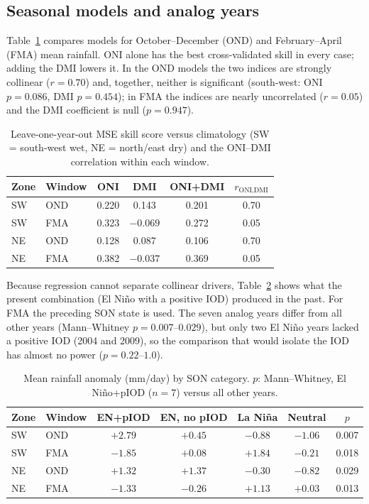 \documentclass{article}
\begin{document}
\subsection{Seasonal models and analog years}
Table~\ref{tab:skill} compares models for October--December (OND) and February--April (FMA) mean
rainfall. ONI alone has the best cross-validated skill in every case; adding the DMI lowers it.
In the OND models the two indices are strongly collinear ($r=0.70$) and, together, neither is
significant (south-west: ONI $p=0.086$, DMI $p=0.454$); in FMA the indices are nearly uncorrelated
($r=0.05$) and the DMI coefficient is null ($p=0.947$).

\begin{table}[t]
\centering
\footnotesize
\caption{Leave-one-year-out MSE skill score versus climatology (SW = south-west wet, NE = north/east
dry) and the ONI--DMI correlation within each window.}
\label{tab:skill}
\begin{tabular}{llcccc}
\toprule
Zone & Window & ONI & DMI & ONI+DMI & $r_{\text{ONI,DMI}}$ \\
\midrule
SW & OND & 0.220 & 0.143 & 0.201 & 0.70 \\
SW & FMA & 0.323 & $-0.069$ & 0.272 & 0.05 \\
NE & OND & 0.128 & 0.087 & 0.106 & 0.70 \\
NE & FMA & 0.382 & $-0.037$ & 0.369 & 0.05 \\
\bottomrule
\end{tabular}
\end{table}

Because regression cannot separate collinear drivers, Table~\ref{tab:analog} shows what the present
combination (El Ni\~{n}o with a positive IOD) produced in the past. For FMA the preceding SON state
is used. The seven analog years differ from all other years (Mann--Whitney $p=0.007$--$0.029$), but
only two El Ni\~{n}o years lacked a positive IOD (2004 and 2009), so the comparison that would isolate
the IOD has almost no power ($p=0.22$--$1.0$).

\begin{table}[t]
\centering
\footnotesize
\setlength{\tabcolsep}{2.5pt}
\caption{Mean rainfall anomaly (mm/day) by SON category. $p$: Mann--Whitney, El Ni\~{n}o+pIOD
($n=7$) versus all other years.}
\label{tab:analog}
\begin{tabular}{llccccc}
\toprule
Zone & Window & EN+pIOD & EN, no pIOD & La Ni\~{n}a & Neutral & $p$ \\
\midrule
SW & OND & $+2.79$ & $+0.45$ & $-0.88$ & $-1.06$ & 0.007 \\
SW & FMA & $-1.85$ & $+0.08$ & $+1.84$ & $-0.21$ & 0.018 \\
NE & OND & $+1.32$ & $+1.37$ & $-0.30$ & $-0.82$ & 0.029 \\
NE & FMA & $-1.33$ & $-0.26$ & $+1.13$ & $+0.03$ & 0.013 \\
\bottomrule
\end{tabular}
\end{table}
\end{document}
